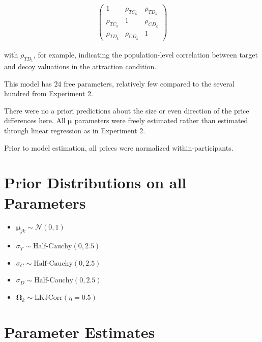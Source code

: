 \begin{align}
   \begin{pmatrix}
      1 & \rho_{TC_k} & \rho_{TD_k} \\
      \rho_{TC_k} & 1 & \rho_{CD_k} \\
      \rho_{TD_k} & \rho_{CD_k} & 1 
   \end{pmatrix}
\end{align}

with $\rho_{TD_1}$, for example, indicating the population-level correlation between target and decoy valuations in the attraction condition.

This model has $24$ free parameters, relatively few compared to the several hundred from Experiment 2.

There were no a priori predictions about the size or even direction of the price differences here. All $\boldsymbol{\mu}$ parameters were freely estimated rather than estimated through linear regression as in Experiment 2.

Prior to model estimation, all prices were normalized within-participants. 

\section{Prior Distributions on all Parameters}

\begin{itemize}
    \item $\boldsymbol{\mu}_{jk} \sim \mathcal{N}(0,1)$
    \item $\sigma_{T} \sim \text{Half-Cauchy}(0,2.5)$
    \item $\sigma_{C} \sim \text{Half-Cauchy}(0,2.5)$
    \item $\sigma_{D} \sim \text{Half-Cauchy}(0,2.5)$
    \item $\boldsymbol{\Omega}_{k} \sim \text{LKJCorr}(\eta=0.5)$
\end{itemize}

\section{Parameter Estimates}

